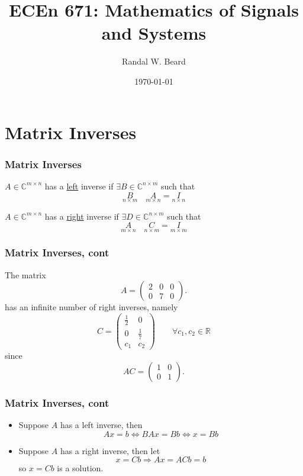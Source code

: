 \documentclass{beamer}
\title{ECEn 671: Mathematics of Signals and Systems}
\author{Randal W. Beard}
\institute{Brigham Young University}
\date{\today}
\begin{document}
\begin{frame}
	\titlepage
\end{frame}

\section{Matrix Inverses}
\frame{\sectionpage}

\begin{frame}\frametitle{Matrix Inverses}
	\begin{definition}
		$A \in \mathbb{C}^{m\times n}$ has a \underline{left} inverse if $\exists B \in \mathbb{C}^{n \times m}$ such that
		\[ \underset{n \times m}{B} \quad \underset{m \times n}{A} = \underset{n \times n}{I}\]
	\end{definition}
	\begin{definition}
		$A \in \mathbb{C}^{m \times n}$ has a \underline{right} inverse if $\exists D \in \mathbb{C}^{n \times m}$ such that 
		\[ \underset{m \times n}{A} \quad \underset{n \times m}{C} = \underset{m \times m}{I} \]
	\end{definition}
\end{frame}

\begin{frame}\frametitle{Matrix Inverses, cont}
	
	\begin{example}
		The matrix
		\[ A = \begin{pmatrix} 2 & 0 & 0\\ 0 & 7 & 0 \end{pmatrix}. \]
		has an infinite number of right inverses, namely
		\[ C = \begin{pmatrix} \frac{1}{2} & 0\\ 0 & \frac{1}{7}\\ c_1 & c_2 \end{pmatrix} 
			\qquad \forall c_1,c_2 \in \mathbb{R} \]
		since 
		\[
		AC = \begin{pmatrix} 1 & 0\\ 0 & 1 \end{pmatrix}.
		\]
	\end{example}
	
\end{frame}


\begin{frame}\frametitle{Matrix Inverses, cont}
	\begin{itemize} 
	\item 	Suppose $A$ has a left inverse, then 
	\[ Ax = b \iff BAx = Bb \iff x = Bb \]
	\item Suppose $A$ has a right inverse, then let
	\[ x = Cb \Rightarrow Ax = ACb = b\]
	so $x = Cb$ is a solution.
	\end{itemize}
\end{frame}
\end{document}

